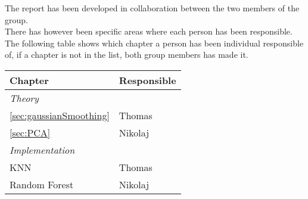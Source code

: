 \documentclass[report]{subfiles}
\begin{document}
The report has been developed in collaboration between the two members of the group.\\
There has however been specific areas where each person has been responsible.\\
The following table shows which chapter a person has been individual responsible of, if a chapter is not in the list, both group members has made it.
	
\begin{tabularx}{\textwidth} {| l | X |}
	\hline
	\textbf{Chapter} & 
	\textbf{Responsible}\\
	\hline
	\textit{Theory}	& \\
	\ref{sec:gaussianSmoothing} \nameref{sec:gaussianSmoothing} & 
		Thomas\\
	\ref{sec:PCA} \nameref{sec:PCA} & 
		Nikolaj\\
	\hline
	\textit{Implementation} & \\
		KNN	& Thomas \\
		Random Forest & Nikolaj \\
	\hline
\end{tabularx}
\end{document}
